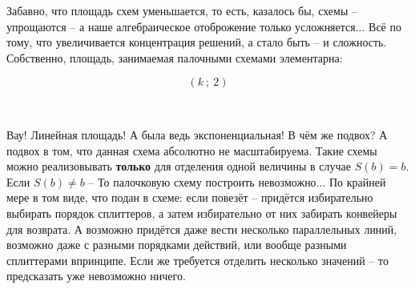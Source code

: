 \vspace{0.5in}




Забавно, что площадь схем уменьшается, то есть, казалось бы, схемы -- упрощаются -- а наше алгебраическое отоброжение только усложняется... Всё по тому, что увеличивается концентрация решений, а стало быть -- и сложность. Собственно, площадь, занимаемая палочными схемами элементарна:

$$
\left(
k
\ ; \
2
\right)
$$

\

Вау! Линейная площадь! А была ведь экспоненциальная! В чём же подвох? А подвох в том, что данная схема абсолютно не масштабируема. Такие схемы можно реализовывать \textbf{только} для отделения одной величины в случае $S(b) = b$. Если $S(b) \ne b$ -- То палочковую схему построить невозможно... По крайней мере в том виде, что подан в схеме: если повезёт -- придётся избирательно выбирать порядок сплиттеров, а затем избирательно от них забирать конвейеры для возврата. А возможно придётся даже вести несколько параллельных линий, возможно даже с разными порядками действий, или вообще разными сплиттерами впринципе. Если же требуется отделить несколько значений -- то предсказать уже невозможно ничего.






























































